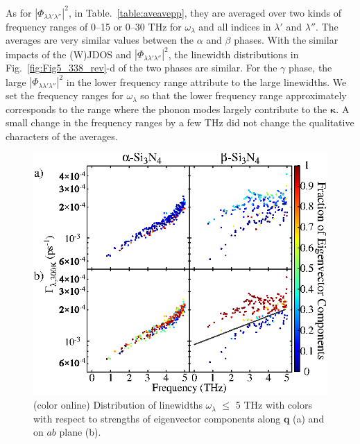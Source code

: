 \documentclass[twocolumn,amsmath,amssymb,a4paper,prb,superscriptaddress,floatfix]{revtex4-1}
\begin{document}
As for $|\Phi_{\lambda\lambda'\lambda''}|^2$, in Table.~\ref{table:aveavepp},
they are averaged over two kinds of frequency ranges of 0--15 or 0--30 THz for
$\omega_\lambda$ and all indices in $\lambda'$ and $\lambda''$.  The averages
are very similar values between the $\alpha$ and $\beta$ phases. With the
similar impacts of the (W)JDOS and $|\Phi_{\lambda\lambda'\lambda''}|^2$, the
linewidth distributions in Fig.~\ref{fig:Fig5_338_rev}-d of the two phases are
similar.  For the $\gamma$ phase, the large
$|\Phi_{\lambda\lambda'\lambda''}|^2$ in the lower frequency range attribute to
the large linewidths.  We set the frequency ranges for $\omega_\lambda$ so that
the lower frequency range approximately corresponds to the range where the
phonon modes largely contribute to the $\boldsymbol{\kappa}$. A small change in
the frequency ranges by a few THz did not change the qualitative characters of
the averages.  

\begin{figure}[ht]
 \centering
  \includegraphics[width=\linewidth]{figure_analyze_gamma3_m1010_print.eps} \caption{(color
	  online) Distribution of linewidths $\omega_\lambda$ $\leq$ 5 THz
		  with colors with respect to strengths of eigenvector components along $\mathbf q$ (a)
		  and on $ab$ plane (b).} \label{fig:Fig7_338} 
 \centering
\end{figure}
\end{document}
